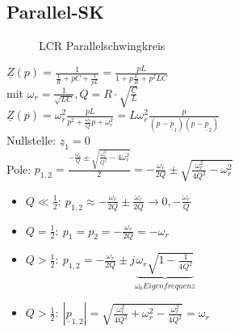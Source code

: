 \subsection{Parallel-SK}
\begin{figure}
	\centering
	
  \caption[LCR Parallelschwingkreis]{LCR Parallelschwingkreis}
  \label{fig:ElNetzw:LCRParallelschwingkreis}
\end{figure}
$\underline{Z}(p)=\frac{1}{\frac{1}{R}+pC+\frac{1}{pL}}=\frac{pL}{1+p\frac{L}{R}+p^2LC}$\\
mit $\omega_r=\frac{1}{\sqrt{LC}}, Q=R\cdot\sqrt{\frac{C}{L}}$\\
$\underline{Z}(p)=\omega_r^2\frac{pL}{p^2+\frac{\omega_r}{Q}p+\omega_r^2}=L\omega_r^2
\frac{p}{(p-\underline{p}_1)(p-\underline{p}_2)}$\\
Nullstelle: $\underline{z}_1=0$\\
Pole:
$p_{1,2}=\frac{-\frac{\omega_r}{Q}\pm\sqrt{\frac{\omega_r^2}{Q^2}-4\omega_r^2}}{2}=-\frac{\omega_r}{2Q}\pm\sqrt{\frac{\omega_r^2}{4Q^2}-\omega_r^2}$\\
\begin{itemize}
  \item $Q\ll\frac{1}{2}:\
  p_{1,2}\approx-\frac{\omega_r}{2Q}\pm\frac{\omega_r}{2Q}\rightarrow 0,
  -\frac{\omega_r}{Q}$
  \item $Q=\frac{1}{2}:\ p_1=p_2=-\frac{\omega_r}{2Q}=-\omega_r$
  \item $Q>\frac{1}{2}:\ p_{1,2}=-\frac{\omega_r}{2Q}\pm
  j\underbrace{\omega_r\sqrt{1-\frac{1}{4Q^2}}}_{\omega_0 Eigenfrequenz}$
  \item $Q>\frac{1}{2}:\ 
  |\underline{p}_{1,2}|=\sqrt{\frac{\omega_r^2}{4Q^2}+\omega_r^2-\frac{\omega_r^2}{4Q^2}}=\omega_r$
\end{itemize}

